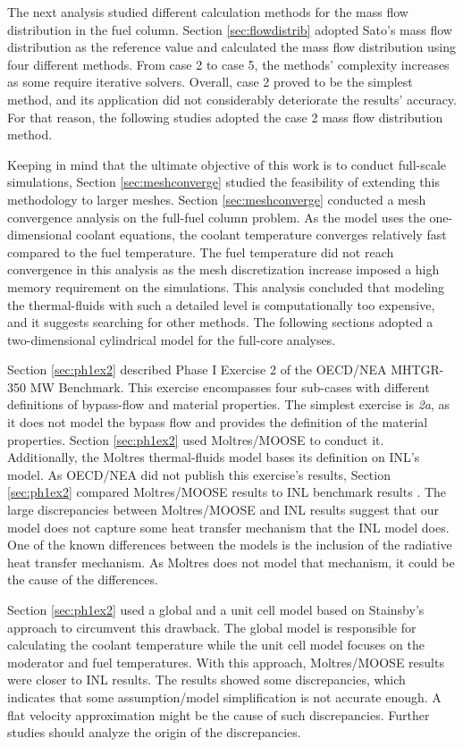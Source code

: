The next analysis studied different calculation methods for the mass flow distribution in the fuel column.
Section \ref{sec:flowdistrib} adopted Sato's mass flow distribution as the reference value and calculated the mass flow distribution using four different methods.
From case 2 to case 5, the methods' complexity increases as some require iterative solvers.
Overall, case 2 proved to be the simplest method, and its application did not considerably deteriorate the results' accuracy.
For that reason, the following studies adopted the case 2 mass flow distribution method.

Keeping in mind that the ultimate objective of this work is to conduct full-scale simulations, Section \ref{sec:meshconverge} studied the feasibility of extending this methodology to larger meshes.
Section \ref{sec:meshconverge} conducted a mesh convergence analysis on the full-fuel column problem.
As the model uses the one-dimensional coolant equations, the coolant temperature converges relatively fast compared to the fuel temperature.
The fuel temperature did not reach convergence in this analysis as the mesh discretization increase imposed a high memory requirement on the simulations.
This analysis concluded that modeling the thermal-fluids with such a detailed level is computationally too expensive, and it suggests searching for other methods.
The following sections adopted a two-dimensional cylindrical model for the full-core analyses.

Section \ref{sec:ph1ex2} described Phase I Exercise 2 of the OECD/NEA MHTGR-350 MW Benchmark.
This exercise encompasses four sub-cases with different definitions of bypass-flow and material properties.
The simplest exercise is \textit{2a}, as it does not model the bypass flow and provides the definition of the material properties.
Section \ref{sec:ph1ex2} used Moltres/MOOSE to conduct it.
Additionally, the Moltres thermal-fluids model bases its definition on INL's model.
As OECD/NEA did not publish this exercise’s results, Section \ref{sec:ph1ex2} compared Moltres/MOOSE results to INL benchmark results \cite{strydom_inl_2013}.
The large discrepancies between Moltres/MOOSE and INL results suggest that our model does not capture some heat transfer mechanism that the INL model does.
One of the known differences between the models is the inclusion of the radiative heat transfer mechanism.
As Moltres does not model that mechanism, it could be the cause of the differences.

Section \ref{sec:ph1ex2} used a global and a unit cell model based on Stainsby's approach \cite{stainsby_investigation_2008} to circumvent this drawback.
The global model is responsible for calculating the coolant temperature while the unit cell model focuses on the moderator and fuel temperatures.
With this approach, Moltres/MOOSE results were closer to INL results.
The results showed some discrepancies, which indicates that some assumption/model simplification is not accurate enough.
A flat velocity approximation might be the cause of such discrepancies.
Further studies should analyze the origin of the discrepancies.

